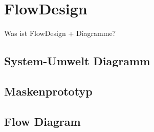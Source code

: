 
\section{FlowDesign}
Was ist FlowDesign + Diagramme?

\subsection{System-Umwelt Diagramm}
\subsection{Maskenprototyp}
\subsection{Flow Diagram}